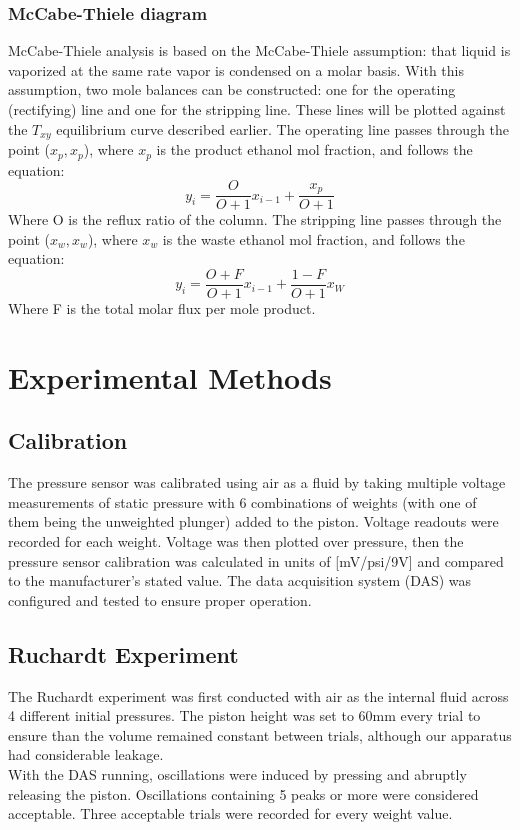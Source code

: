 \documentclass[lettersize,journal]{IEEEtran}
\begin{document}
	\subsubsection{McCabe-Thiele diagram}
	McCabe-Thiele analysis is based on the McCabe-Thiele assumption: that liquid is vaporized at the same rate vapor is condensed on a molar basis. With this assumption, two mole balances can be constructed: one for the operating (rectifying) line and one for the stripping line. These lines will be plotted against the $T_{xy}$ equilibrium curve described earlier. The operating line passes through the point ($x_{p},x_{p}$), where $x_{p}$ is the product ethanol mol fraction, and follows the equation:
	\begin{equation}
		\label{deqn_ex5.5}
		y_{i} = \frac{O}{O+1}x_{i-1} + \frac{x_{p}}{O+1}
	\end{equation}
	Where O is the reflux ratio of the column. The stripping line passes through the point ($x_{w},x_{w}$), where $x_{w}$ is the waste ethanol mol fraction, and follows the equation:
	\begin{equation}
		\label{deqn_ex5.5}
		y_{i} = \frac{O+F}{O+1}x_{i-1} + \frac{1-F}{O+1}x_{W}
	\end{equation}
	Where F is the total molar flux per mole product.
	
	
	
	
	\section{Experimental Methods}
	\subsection{Calibration}
	The pressure sensor was calibrated using air as a fluid by taking multiple voltage measurements of static pressure with 6 combinations of weights (with one of them being the unweighted plunger) added to the piston. Voltage readouts were recorded for each weight. Voltage was then plotted over pressure, then the pressure sensor calibration was calculated in units of [mV/psi/9V] and compared to the manufacturer's stated value.
	The data acquisition system (DAS) was configured and tested to ensure proper operation.
	\subsection{Ruchardt Experiment}
	The Ruchardt experiment was first conducted with air as the internal fluid across 4 different initial pressures. The piston height was set to 60mm every trial to ensure than the volume remained constant between trials, although our apparatus had considerable leakage. \\With the DAS running, oscillations were induced by pressing and abruptly releasing the piston.
	Oscillations containing 5 peaks or more were considered acceptable. Three acceptable trials were recorded for every weight value.
	
\end{document}
